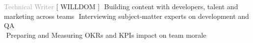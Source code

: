 \begin{cvtable}
{\textcolor{darkgray}{%
    Technical Writer
    }}%
{[ {W\scriptsize ILL}{D\scriptsize OM} ]}%
{%
    \textperiodcentered $ $ Building content with developers, talent and marketing across teams 
    \textperiodcentered $ $ Interviewing subject-matter experts on development and QA \\
    \textperiodcentered $ $ Preparing and Measuring OKRs and KPIs impact on team morale \\
} 


\end{cvtable}
